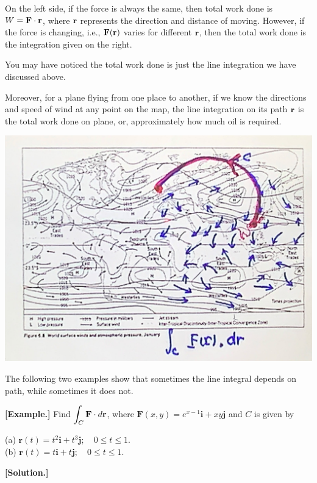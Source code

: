 \documentclass[11pt, a4paper]{MATH2023}
\newcommand{\eg}{\textbf{[Example.] }}
\newcommand{\sol}{\textbf{[Solution.] }}
\newcommand{\rr}{{\bf r}}
\newcommand{\FF}{{\bf F}}
\begin{document}
\begin{spacing}{1.3}
\begin{center}
    \end{center}
    On the left side, if the force is always the same, then total work done is $W=\FF\cdot \rr$,
    where $\rr$ represents the direction and distance of moving. However, if the force is changing,
    i.e., $\FF(\rr)$ varies for different $\rr$, then the total work done is the integration given on the right.

    You may have noticed the total work done is just the line integration we have discussed above.

    Moreover, for a plane flying from one place to another, if we know the directions and speed of wind
    at any point on the map, the line integration on its path $\rr$ is the total work done on plane,
    or, approximately how much oil is required.
    \begin{center}
        \includegraphics[scale=0.14]{images/Ch15-plane-oil.JPG}
    \end{center}


    \newpage
    {\blue The following two examples show that sometimes the line integral depends on path,
    while sometimes it does not.}

    \eg Find $\displaystyle \int_{C} \mathbf{F} \cdot d \mathbf{r}$, where $\mathbf{F}(x, y)=e^{x-1} \mathbf{i}+x y \mathbf{j}$ 
    and $C$ is given by

    (a) $\mathbf{r}(t)=t^{2} \mathbf{i}+t^{3} \mathbf{j} ; \quad 0 \leqslant t \leqslant 1$.\\
    (b) $\mathbf{r}(t)=t \mathbf{i}+t \mathbf{j} ; \quad 0 \leqslant t \leqslant 1 .$

    \sol 


\end{spacing}
\end{document}
